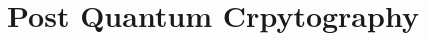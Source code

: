 \documentclass[journal]{IEEEtran}
\begin{document}
\section{Post Quantum Crpytography}

%
%



%
%
\end{document}
